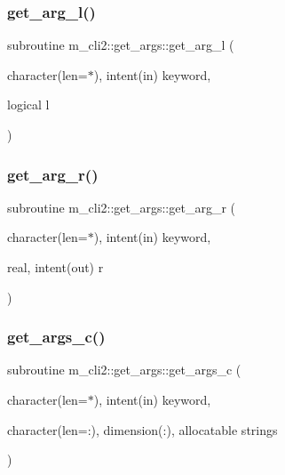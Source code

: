 \subsubsection{\texorpdfstring{get\+\_\+arg\+\_\+l()}{get\_arg\_l()}}
{\footnotesize\ttfamily subroutine m\+\_\+cli2\+::get\+\_\+args\+::get\+\_\+arg\+\_\+l (\begin{DoxyParamCaption}\item[{character(len=$\ast$), intent(in)}]{keyword,  }\item[{logical}]{l }\end{DoxyParamCaption})\hspace{0.3cm}{\ttfamily [private]}}

\mbox{\label{interfacem__cli2_1_1get__args_ad3ded65b5d473fd6ab52a733defeddfe}} 
\subsubsection{\texorpdfstring{get\+\_\+arg\+\_\+r()}{get\_arg\_r()}}
{\footnotesize\ttfamily subroutine m\+\_\+cli2\+::get\+\_\+args\+::get\+\_\+arg\+\_\+r (\begin{DoxyParamCaption}\item[{character(len=$\ast$), intent(in)}]{keyword,  }\item[{real, intent(out)}]{r }\end{DoxyParamCaption})\hspace{0.3cm}{\ttfamily [private]}}

\mbox{\label{interfacem__cli2_1_1get__args_ace85b451389be5cadee3cc8566f004b1}} 
\subsubsection{\texorpdfstring{get\+\_\+args\+\_\+c()}{get\_args\_c()}}
{\footnotesize\ttfamily subroutine m\+\_\+cli2\+::get\+\_\+args\+::get\+\_\+args\+\_\+c (\begin{DoxyParamCaption}\item[{character(len=$\ast$), intent(in)}]{keyword,  }\item[{character(len=\+:), dimension(\+:), allocatable}]{strings }\end{DoxyParamCaption})\hspace{0.3cm}{\ttfamily [private]}}

